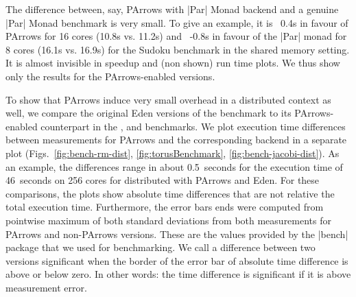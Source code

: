 The difference between, say, PArrows with |Par| Monad backend and a
genuine |Par|
Monad benchmark is very small. To give an example, it is ~0.4s in favour of PArrows for 16 cores (10.8s vs. 11.2s) and ~-0.8s in favour of the |Par| monad for 8 cores (16.1s vs. 16.9s) for
the Sudoku benchmark in the shared memory setting. It is almost invisible in speedup and
(non shown) run time plots. We thus show only the results for the
PArrows-enabled versions.

To show that PArrows induce very small overhead in a distributed context as well, we compare the original Eden
versions of the benchmark to its PArrows-enabled counterpart in the \rmtest, \torustest and \jacobitest benchmarks. We plot execution time differences between measurements for
PArrows and the corresponding backend in a separate plot
(Figs.~\ref{fig:bench-rm-dist}, \ref{fig:torusBenchmark}, \ref{fig:bench-jacobi-dist}). As an example, the differences range in
about 0.5~seconds for the execution time of 46~seconds on 256 cores
for distributed \rmtest with PArrows and Eden. For these comparisons, the plots show absolute
time differences that are not relative \wrt the total execution time.
Furthermore, the error bars ends were computed from pointwise maximum of both standard
deviations from both measurements for PArrows and non-PArrows
versions. These are the values provided by the |bench| package that we
used for benchmarking. We call a difference between two versions
significant when the border of the error bar of absolute time
difference is above or below zero. In other words: the time
difference is significant if it is above measurement error.

\subsubsection{\rmtest}\label{sec:rmtest}

\newcommand{\performanceSkelRMSM}[2]{
\performanceplot{Parallel run time of \rmtest ``#2''}{Eden CP, Multicore, |Par| Monad}{16}{4}{
\addplot+ [very thick] table [scatter, x="nCores", y="time", col sep=comma, mark=none,
smooth]{benchmarks/sm-rm/bench-sm-rm.bench.skelrm-parr-eden-cp-#1-#2.csv};
\addplot+ [very thick] table [scatter, x="nCores", y="time", col sep=comma, mark=none,
smooth]{benchmarks/sm-rm/bench-sm-rm.bench.skelrm-parr-mult-#1-#2.csv};
\addplot+ [very thick] table [scatter, x="nCores", y="time", col sep=comma, mark=none,
smooth]{benchmarks/sm-rm/bench-sm-rm.bench.skelrm-parr-par-#1-#2.csv};
}{17}{\plotwidthSMP}
}

